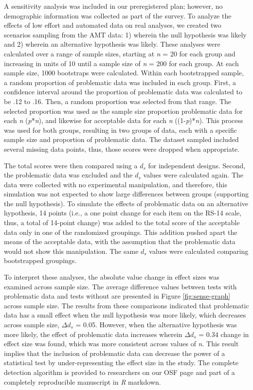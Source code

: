 \documentclass[english,man]{apa6}
\theoremstyle{definition}
\theoremstyle{definition}
\theoremstyle{definition}
\theoremstyle{remark}
\begin{document}
A sensitivity analysis was included in our preregistered plan; however,
no demographic information was collected as part of the survey. To
analyze the effects of low effort and automated data on real analyses,
we created two scenarios sampling from the AMT data: 1) wherein the null
hypothesis was likely and 2) wherein an alternative hypothesis was
likely. These analyses were calculated over a range of sample sizes,
starting at \emph{n} = 20 for each group and increasing in units of 10
until a sample size of \emph{n} = 200 for each group. At each sample
size, 1000 bootstraps were calculated. Within each bootstrapped sample,
a random proportion of problematic data was included in each group.
First, a confidence interval around the proportion of problematic data
was calculated to be .12 to .16. Then, a random proportion was selected
from that range. The selected proportion was used as the sample size
proportion problematic data for each \emph{n} (\emph{p}*\emph{n}), and
likewise for acceptable data for each \emph{n} ((1-\emph{p})*\emph{n}).
This process was used for both groups, resulting in two groups of data,
each with a specific sample size and proportion of problematic data. The
dataset sampled included several missing data points, thus, those scores
were dropped when appropriate.

The total scores were then compared using a \(d_s\) for independent
designs. Second, the problematic data was excluded and the \(d_s\)
values were calculated again. The data were collected with no
experimental manipulation, and therefore, this simulation was not
expected to show large differences between groups (supporting the null
hypothesis). To simulate the effects of problematic data on an
alternative hypothesis, 14 points (i.e., a one point change for each
item on the RS-14 scale, thus, a total of 14-point change) was added to
the total score of the acceptable data only in one of the randomized
groupings. This addition pushed apart the means of the acceptable data,
with the assumption that the problematic data would not show this
manipulation. The same \(d_s\) values were calculated comparing
bootstrapped groupings.

To interpret these analyses, the absolute value change in effect sizes
was examined across sample size. The average difference values between
tests with problematic data and tests without are presented in Figure
\ref{fig:sense-graph} across sample size. The results from these
comparisons indicated that problematic data has a small effect when the
null hypothesis was more likely, which decreases across sample size,
\(\Delta d_s\) = 0.05. However, when the alternative hypothesis was more
likely, the effect of problematic data increases wherein \(\Delta d_s\)
= 0.34 change in effect size was found, which was more consistent across
values of \emph{n}. This result implies that the inclusion of
problematic data can decrease the power of a statistical test by
under-representing the effect size in the study. The complete detection
algorithm is provided to researchers on our OSF page and part of a
completely reproducible manuscript in \emph{R} markdown.
\end{document}
